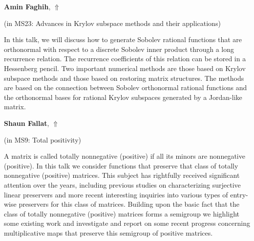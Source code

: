 \documentclass[ILAS2025-program.tex]{subfiles}
\begin{document}
\hypertarget{down0393}{}\begin{ilasabstract}
    
\textbf{Amin Faghih},  \hfill \hyperlink{up0393}{$\Uparrow$}
    
    
(in {\color{mstitle}MS23: Advances in Krylov subspace methods and their applications})
        
\mtskip
    In this talk, we will discuss how to generate Sobolev rational functions that are orthonormal with respect to a discrete Sobolev inner product through a long recurrence relation. The recurrence coefficients of this relation can be stored in a Hessenberg pencil. Two important numerical methods are those based on Krylov subspace methods and those based on restoring matrix structures. The methods are based on the connection between Sobolev orthonormal rational functions and the orthonormal bases for rational Krylov subspaces generated by a Jordan-like matrix.
\end{ilasabstract}
    

\hypertarget{down0010}{}\begin{ilasabstract}
    
\textbf{Shaun Fallat},  \hfill \hyperlink{up0010}{$\Uparrow$}
    
    
(in {\color{mstitle}MS9: Total positivity})
        
\mtskip
    A matrix is called totally nonnegative (positive) if all its minors are nonnegative (positive). In this talk we consider functions that preserve that class of totally nonnegative (positive) matrices. This subject has rightfully received significant attention over the years, including previous studies on characterizing surjective linear preservers and more recent interesting inquiries into various types of entry-wise preservers for this class of matrices. Building upon the basic fact that the class of totally nonnegative (positive) matrices forms a semigroup we highlight some existing work and investigate and report on some recent progress concerning multiplicative maps that preserve this semigroup of positive matrices.

\end{ilasabstract}
    
\end{document}
